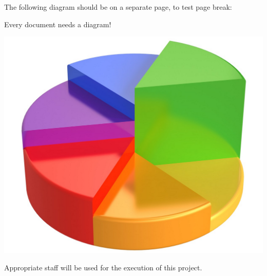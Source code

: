 The following diagram should be on a separate page, to test page break:

\pagebreak


Every document needs a diagram!

\includegraphics{SHbO80B3zYiLwN09wcE1jxTyLWaBsr7llKXblVz0EwCQsT2EsGznwPa4YwxgN3BwyMSEZhyazyYEoA5TNEBswNe6FJ2ZZsw9_E5R3YnzdCYFfcxjoR-rnHg.jpg}

\pagebreak



Appropriate staff will be used for the execution of this project.


